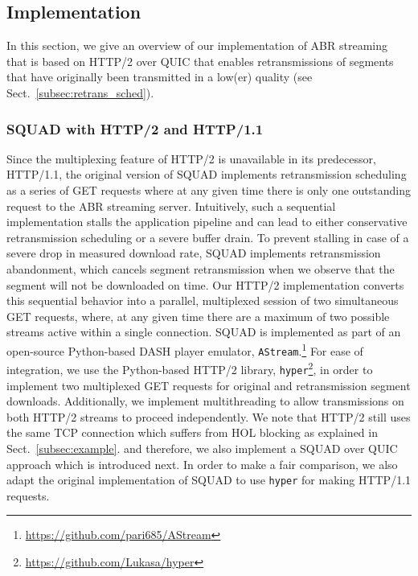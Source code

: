 \subsection{Implementation}
\label{subsec:impl}
In this section, we give an overview of our implementation of ABR streaming that is based on HTTP/2 over QUIC that enables retransmissions of segments that have originally been transmitted in a low(er) quality (see Sect.~\ref{subsec:retrans_sched}).

\subsubsection{SQUAD with HTTP/2 and HTTP/1.1}
Since the multiplexing feature of HTTP/2 is unavailable in its predecessor, HTTP/1.1, the original version of SQUAD implements retransmission scheduling as a series of GET requests where at any given time there is only one outstanding request to the ABR streaming server. Intuitively, such a sequential implementation stalls the application pipeline and can lead to either conservative retransmission scheduling or a severe buffer drain.
To prevent stalling in case of a severe drop in measured download rate, SQUAD implements retransmission abandonment, which cancels segment retransmission when we observe that the segment will not be downloaded on time.
Our HTTP/2 implementation converts this sequential behavior into a parallel, multiplexed session of two simultaneous GET requests, where, at any given time there are a maximum of two possible streams active within a single connection. SQUAD is implemented as part of an open-source Python-based DASH player emulator, \texttt{AStream}.\footnote{\url{https://github.com/pari685/AStream}} For ease of integration, we use the Python-based HTTP/2 library, \texttt{hyper}\footnote{\url{https://github.com/Lukasa/hyper}}, in order to implement two multiplexed GET requests for original and retransmission segment downloads. Additionally, we implement multithreading to allow transmissions on both HTTP/2 streams to proceed independently. We note that HTTP/2 still uses the same TCP connection which suffers from HOL blocking as explained in Sect.~\ref{subsec:example}. and therefore, we also implement a SQUAD over QUIC approach which is introduced next. In order to make a fair comparison, we also adapt the original implementation of SQUAD to use \texttt{hyper} for making HTTP/1.1 requests.

